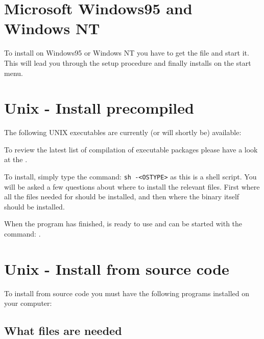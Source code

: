\section{Microsoft Windows95 and Windows NT}%
\label{Install_Windows95NT}

To install \period on Windows95 or Windows NT you have to
get the file
\urlref{\periodnt}{\periodntftp}
and start it.
This will lead you through the setup procedure 
and finally installs \period on the start menu.

\section{Unix - Install precompiled}%
\label{Install_Unix_precompiled}

The following UNIX executables are currently (or will shortly be) available:
\myitemize{\periodbinaries}

To review the latest list of compilation of 
\period executable packages please have a look at 
the .

To install, simply type the command:
{\tt sh \periodfull-<OSTYPE>}
as this is a shell script.
You will be asked a few questions about where to install the relevant files.
First where all the files needed for \period should be installed, and then
where the binary itself should be installed.

When the program has finished, \period is ready to use and can be 
started with the command: {\tt \periodname}.

\newpage
\section{Unix - Install from source code}%
\label{Install_Unix_source}

To install \period from source code you must have the 
following programs installed on your computer:

\subsection{What files are needed}%
\label{Get_SRCS}

